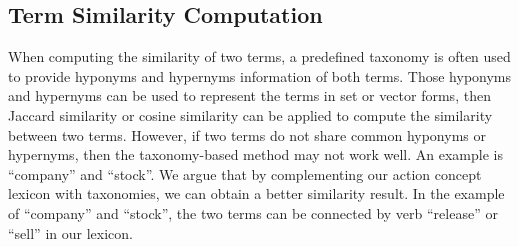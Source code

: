 \subsection{Term Similarity Computation}
\label{sec:sim}
When computing the similarity of two terms, a predefined taxonomy is often used to provide
hyponyms and hypernyms information of both terms.
Those hyponyms and hypernyms can be used to represent the terms in
set or vector forms, then Jaccard similarity or cosine similarity
can be applied to compute the similarity between two terms.
However, if two terms do not share common hyponyms or
hypernyms, then the taxonomy-based method may not work well.
An example is ``company'' and ``stock''. We
argue that by complementing our action concept lexicon with taxonomies, we
can obtain a better similarity result. In the example of ``company'' and
``stock'', the two terms can be connected by verb ``release'' or ``sell''
in our lexicon.

